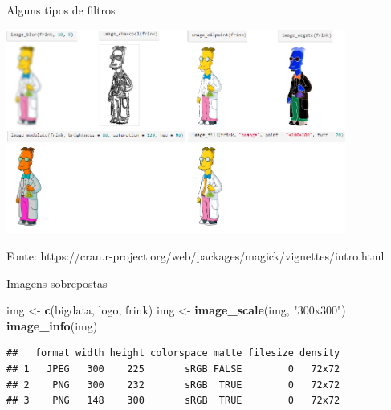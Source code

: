 \documentclass[
  ignorenonframetext,
]{beamer}
\newenvironment{Shaded}{\begin{snugshade}}{\end{snugshade}}
\newcommand{\KeywordTok}[1]{\textcolor[rgb]{0.13,0.29,0.53}{\textbf{#1}}}
\newcommand{\NormalTok}[1]{#1}
\newcommand{\StringTok}[1]{\textcolor[rgb]{0.31,0.60,0.02}{#1}}
\begin{document}
\begin{frame}{Alguns tipos de filtros}
\protect\hypertarget{alguns-tipos-de-filtros}{}

\small

\includegraphics[width=4.4in]{IMAGENS/filtros}

\begin{center}
\tiny{Fonte: https://cran.r-project.org/web/packages/magick/vignettes/intro.html}
\end{center}

\end{frame}

\begin{frame}[fragile]{Imagens sobrepostas}
\protect\hypertarget{imagens-sobrepostas}{}

\small

\begin{Shaded}
\begin{Highlighting}[]
\NormalTok{img <-}\StringTok{ }\KeywordTok{c}\NormalTok{(bigdata, logo, frink)}
\NormalTok{img <-}\StringTok{ }\KeywordTok{image_scale}\NormalTok{(img, }\StringTok{"300x300"}\NormalTok{)}
\KeywordTok{image_info}\NormalTok{(img)}
\end{Highlighting}
\end{Shaded}

\begin{verbatim}
##   format width height colorspace matte filesize density
## 1   JPEG   300    225       sRGB FALSE        0   72x72
## 2    PNG   300    232       sRGB  TRUE        0   72x72
## 3    PNG   148    300       sRGB  TRUE        0   72x72
\end{verbatim}

\end{frame}
\end{document}
